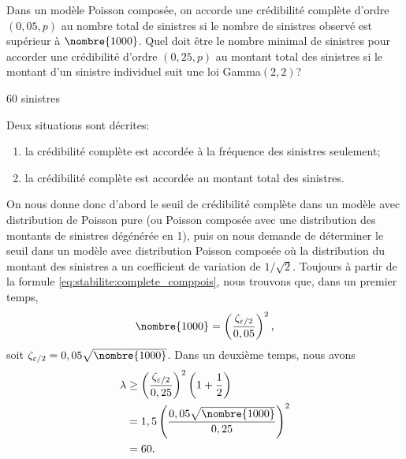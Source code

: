 \begin{exercice}
  Dans un modèle Poisson composée, on accorde une crédibilité complète
  d'ordre $(0,05, p)$ au nombre total de sinistres si le nombre de
  sinistres observé est supérieur à $\nombre{1000}$. Quel doit être le
  nombre minimal de sinistres pour accorder une crédibilité d'ordre
  $(0,25, p)$ au montant total des sinistres si le montant d'un
  sinistre individuel suit une loi Gamma$(2, 2)$?
  \begin{rep}
    60 sinistres
  \end{rep}
  \begin{sol}
    Deux situations sont décrites:
    \begin{enumerate}[1)]
    \item la crédibilité complète est accordée à la fréquence des
      sinistres seulement;
    \item la crédibilité complète est accordée au montant total des
      sinistres.
    \end{enumerate}
    On nous donne donc d'abord le seuil de crédibilité complète dans
    un modèle avec distribution de Poisson pure (ou Poisson composée
    avec une distribution des montants de sinistres dégénérée en 1),
    puis on nous demande de déterminer le seuil dans un modèle avec
    distribution Poisson composée où la distribution du montant des
    sinistres a un coefficient de variation de $1/\sqrt{2}$. Toujours
    à partir de la formule \eqref{eq:stabilite:complete_comppois},
    nous trouvons que, dans un premier temps,
    \begin{equation*}
      \nombre{1000} =
      \left(
        \frac{\zeta_{\varepsilon/2}}{0,05}
      \right)^2,
    \end{equation*}
    soit $\zeta_{\varepsilon/2} = 0,05 \sqrt{\nombre{1000}}$. Dans un
    deuxième temps, nous avons
    \begin{align*}
      \lambda
      &\geq
      \left(
        \frac{\zeta_{\varepsilon/2}}{0,25}
      \right)^2
      \left(
        1 + \frac{1}{2}
      \right) \\
      &= 1,5
      \left(
        \frac{0,05 \sqrt{\nombre{1000}}}{0,25}
      \right)^2 \\
      &= 60.
    \end{align*}
  \end{sol}
\end{exercice}

